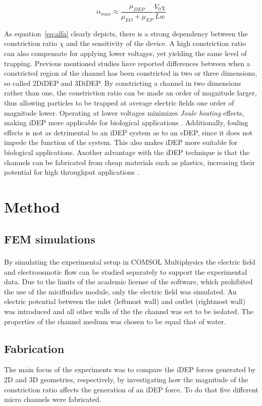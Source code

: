 \documentclass[journal, a4paper]{IEEEtran}
\begin{document}
\begin{equation}\label{eq:alfa}
\alpha _{max}\approx \frac{\mu _{DEP}}{\mu _{EO}+\mu _{EP}}\frac{V_{0}\chi }{Lw}
\end{equation}

As equation~\eqref{eq:alfa} clearly depicts, there is a strong dependency between the constriction ratio $\chi$ and the sensitivity of the device. A high constriction ratio can also compensate for applying lower voltages, yet yielding the same level of trapping. Previous mentioned studies have reported differences between when a constricted region of the channel has been constricted in two or three dimensions, so called 2DiDEP and 3DiDEP. By constricting a channel in two dimensions rather than one, the constriction ratio can be made an order of magnitude larger, thus allowing particles to be trapped at average electric fields one order of magnitude lower. Operating at lower voltages minimizes \textit{Joule heating} effects, making iDEP more applicable for biological applications \cite{Braff:12}. Additionally, fouling effects is not as detrimental to an iDEP system as to an eDEP, since it does not impede the function of the system. This also makes iDEP more suitable for biological applications. Another advantage with the iDEP technique is that the channels can be fabricated from cheap materials such as plastics, increasing their potential for high throughput applications \cite{martinez2009}.

\section{Method}\label{sec:method}

\subsection{FEM simulations}
By simulating the experimental setup in COMSOL Multiphysics\textsuperscript{\textregistered} the electric field and electroosmotic flow can be studied separately to support the experimental data. Due to the limits of the academic license of the software, which prohibited the use of the micifluidics module, only the electric field was simulated. An electric potential between the inlet (leftmost wall) and outlet (rightmost wall) was introduced and all other walls of the the channel was set to be isolated. The properties of the channel medium was chosen to be equal that of water.

\subsection{Fabrication}
The main focus of the experiments was to compare the iDEP forces generated by 2D and 3D geometries, respectively, by investigating how the magnitude of the constriction ratio affects the generation of an iDEP force. To do that five different micro channels were fabricated.
\end{document}
